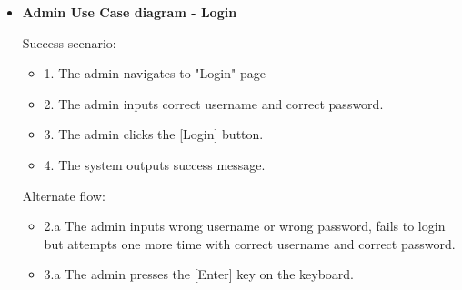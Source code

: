 \documentclass[12pt,a4paper,titlepage]{article}
\begin{document}
\begin{itemize}
\item
\noindent\textbf{Admin Use Case diagram - Login}
\begin{description}
    \item[Success scenario:]
\end{description}
\renewcommand{\labelenumii}{\arabic{enumii}}
\begin{itemize}
  \item 1. The admin navigates to "Login" page
  \item 2. The admin inputs correct username and correct password.
  \item 3. The admin clicks the [Login] button.
  \item 4. The system outputs success message.
\end{itemize}
\begin{description}
    \item[Alternate flow:]
\end{description}
\begin{itemize}
  \item 2.a The admin inputs wrong username or wrong password, fails to login but attempts one more time with correct username and correct password.
  \item 3.a The admin presses the [Enter] key on the keyboard.

\end{itemize}
\end{itemize}

\clearpage
\cleardoublepage
\end{document}

